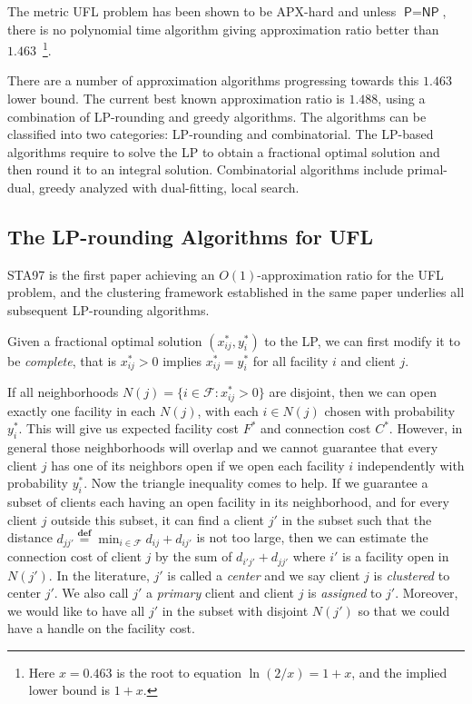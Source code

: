 \documentclass[11pt]{article}
\newcommand{\fac}{\mathcal{F}}
\newcommand{\PP}{\textsf{P}}
\newcommand{\NP}{\textsf{NP}}
\newcommand{\suchthat}{:}
\newcommand{\defeq}{\stackrel{\textbf{def}}{=}}
\begin{document}
The metric UFL problem has been shown to be APX-hard and unless $\PP =
\NP$, there is no polynomial time algorithm giving approximation ratio
better than $1.463$~\footnote{Here $x=0.463$ is the root to equation
  $\ln (2/x) = 1+x$, and the implied lower bound is $1+x$.}.

There are a number of approximation algorithms progressing towards
this $1.463$ lower bound. The current best known approximation ratio
is $1.488$, using a combination of LP-rounding and greedy algorithms.
The algorithms can be classified into two categories: LP-rounding and
combinatorial. The LP-based algorithms require to solve the LP to
obtain a fractional optimal solution and then round it to an integral
solution. Combinatorial algorithms include primal-dual, greedy
analyzed with dual-fitting, local search.

\subsection{The LP-rounding Algorithms for UFL}
STA97 is the first paper achieving an $O(1)$-approximation ratio for
the UFL problem, and the clustering framework established in the same
paper underlies all subsequent LP-rounding algorithms.

Given a fractional optimal solution $(x_{ij}^\ast, y_i^\ast)$ to the
LP, we can first modify it to be \emph{complete}, that is
$x_{ij}^\ast>0$ implies $x_{ij}^\ast = y_i^\ast$ for all facility $i$
and client $j$.  

If all neighborhoods $N(j) = \{i\in\fac \suchthat x_{ij}^\ast > 0\}$
are disjoint, then we can open exactly one facility in each $N(j)$,
with each $i\in N(j)$ chosen with probability $y_i^\ast$. This will
give us expected facility cost $F^\ast$ and connection cost $C^\ast$.
However, in general those neighborhoods will overlap and we cannot
guarantee that every client $j$ has one of its neighbors open if we
open each facility $i$ independently with probability $y_i^\ast$. Now
the triangle inequality comes to help. If we guarantee a subset of
clients each having an open facility in its neighborhood, and for
every client $j$ outside this subset, it can find a client $j'$ in the
subset such that the distance $d_{j j'} \defeq \min_{i\in\fac} d_{ij}
+ d_{ij'}$ is not too large, then we can estimate the connection cost
of client $j$ by the sum of $d_{i' j'} + d_{j j'}$ where $i'$ is a
facility open in $N(j')$. In the literature, $j'$ is called a
\emph{center} and we say client $j$ is \emph{clustered} to center
$j'$. We also call $j'$ a \emph{primary} client and client $j$ is
\emph{assigned} to $j'$. Moreover, we would like to have all $j'$ in
the subset with disjoint $N(j')$ so that we could have a handle on the
facility cost.
\end{document}
